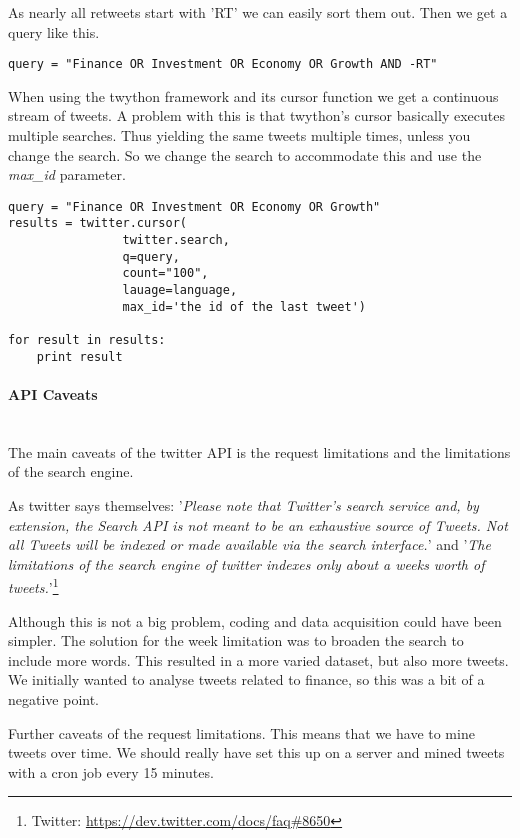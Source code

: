 As nearly all retweets start with 'RT' we can easily sort them out. Then we get
a query like this. 
\begin{verbatim}
query = "Finance OR Investment OR Economy OR Growth AND -RT"
\end{verbatim}

When using the twython framework and its cursor function we get a continuous
stream of tweets. A problem with this is that twython's cursor basically
executes multiple searches. Thus yielding the same tweets multiple times,
unless you change the search. So we change the search to accommodate this and
use the \textit{max\_id} parameter.
\begin{verbatim}
query = "Finance OR Investment OR Economy OR Growth"
results = twitter.cursor(
                twitter.search,
                q=query,
                count="100",
                lauage=language,
                max_id='the id of the last tweet')

for result in results:
    print result
\end{verbatim}
%

\paragraph{API Caveats}
\hspace{0pt}\\
The main caveats of the twitter API is the request limitations and the
limitations of the search engine. 

As twitter says themselves: 
'\textit{Please note that Twitter's search service and, by extension, the Search
API is not meant to be an exhaustive source of Tweets. Not all Tweets will be
indexed or made available via the search interface.}' and 
'\textit{The limitations of the search engine of twitter indexes only about a
weeks worth of tweets.}'\footnote{Twitter:
\url{https://dev.twitter.com/docs/faq#8650}}

Although this is not a big problem, coding and data acquisition could have been
simpler. The solution for the week limitation was to broaden the search to
include more words. This resulted in a more varied dataset, but also more
tweets. We initially wanted to analyse tweets related to finance, so this was a
bit of a negative point.  

Further caveats of the request limitations. This means that we have to mine
tweets over time. We should really have set this up on a server and mined
tweets with a cron job every 15 minutes.
%

